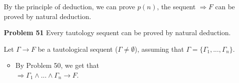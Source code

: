 \begin{enumerate}
\begin{itemize}
\begin{table}[H]
\begin{center}
\begin{tabular}{llll}
    \end{tabular}
    \end{center}
    \end{table}
\end{itemize}
By the principle of deduction, we can prove $p(n)$, the sequent $\Rightarrow F$ can be proved by natural deduction. 





\newpage

\item[\textbf{Problem 51}] Every tautology sequent can be proved by natural deduction. 

Let $\Gamma \rightarrow F$ be a tautological sequent ($\Gamma \neq \emptyset$), assuming that $\Gamma = \{\Gamma_1, ..., \Gamma_n\}$.
  \begin{itemize}
	\item By Problem 50, we get that\\
	  $\Rightarrow \Gamma_1 \wedge ... \wedge \Gamma_n \rightarrow F$.


\end{itemize}
\end{enumerate}
